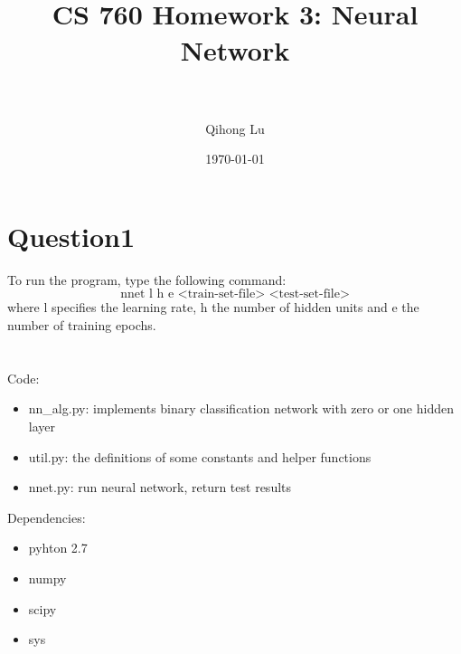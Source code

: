 \documentclass[paper=a4, fontsize=11pt]{scrartcl} %
\title{	
\normalfont \normalsize 
\horrule{0.5pt} \\[0.4cm] %
\huge CS 760 Homework 3: Neural Network\\ %
\horrule{2pt} \\[0.5cm] %
}
\author{Qihong Lu} %
\date{\normalsize\today} %
\numberwithin{equation}{section} %
\numberwithin{figure}{section} %
\numberwithin{table}{section} %
\begin{document}
\maketitle %


\section*{Question1}

To run the program, type the following command: 
$$ \text{nnet l h e <train-set-file> <test-set-file>} $$ 
where l specifies the learning rate, h the number of hidden units and e the number of training epochs. \\\\\\

Code: 
\begin{itemize}
	\item nn\_alg.py: implements binary classification network with zero or one hidden layer 
	\item util.py: the definitions of some constants and helper functions 
	\item nnet.py: run neural network, return test results
\end{itemize}
 
\hfill 

Dependencies: 
\begin{itemize}
  \item pyhton 2.7 
  \item numpy 
  \item scipy 
  \item sys
\end{itemize}



\newpage
\end{document}
